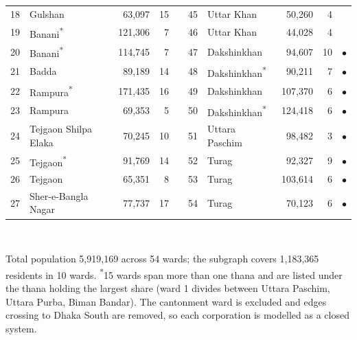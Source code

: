 \begin{table}[htbp]
\begin{tabular}{@{}rlrrc@{\hspace{1.2em}}rlrrc@{}}
18 & Gulshan & 63,097 & 15 &  & 45 & Uttar Khan & 50,260 & 4 &  \\
19 & Banani\textsuperscript{*} & 121,306 & 7 &  & 46 & Uttar Khan & 44,028 & 4 &  \\
20 & Banani\textsuperscript{*} & 114,745 & 7 &  & 47 & Dakshinkhan & 94,607 & 10 & $\bullet$ \\
21 & Badda & 89,189 & 14 &  & 48 & Dakshinkhan\textsuperscript{*} & 90,211 & 7 & $\bullet$ \\
22 & Rampura\textsuperscript{*} & 171,435 & 16 &  & 49 & Dakshinkhan & 107,370 & 6 & $\bullet$ \\
23 & Rampura & 69,353 & 5 &  & 50 & Dakshinkhan\textsuperscript{*} & 124,418 & 6 & $\bullet$ \\
24 & Tejgaon Shilpa Elaka & 70,245 & 10 &  & 51 & Uttara Paschim & 98,482 & 3 & $\bullet$ \\
25 & Tejgaon\textsuperscript{*} & 91,769 & 14 &  & 52 & Turag & 92,327 & 9 & $\bullet$ \\
26 & Tejgaon & 65,351 & 8 &  & 53 & Turag & 103,614 & 6 & $\bullet$ \\
27 & Sher-e-Bangla Nagar & 77,737 & 17 &  & 54 & Turag & 70,123 & 6 & $\bullet$ \\
\bottomrule
\end{tabular}
\\[2pt]\parbox{0.95\textwidth}{\footnotesize Total population 5,919,169 across 54 wards; the subgraph covers 1,183,365 residents in 10 wards. \textsuperscript{*}15 wards span more than one thana and are listed under the thana holding the largest share (ward 1 divides between Uttara Paschim, Uttara Purba, Biman Bandar). The cantonment ward is excluded and edges crossing to Dhaka South are removed, so each corporation is modelled as a closed system.}
\end{table}
